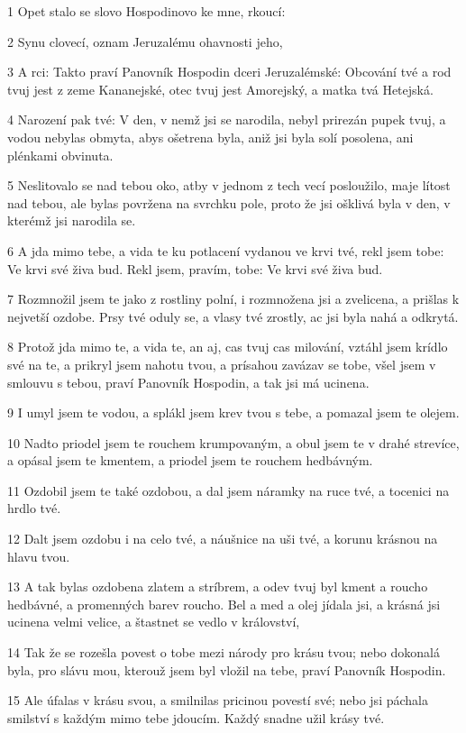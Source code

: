 \par 1 Opet stalo se slovo Hospodinovo ke mne, rkoucí:
\par 2 Synu clovecí, oznam Jeruzalému ohavnosti jeho,
\par 3 A rci: Takto praví Panovník Hospodin dceri Jeruzalémské: Obcování tvé a rod tvuj jest z zeme Kananejské, otec tvuj jest Amorejský, a matka tvá Hetejská.
\par 4 Narození pak tvé: V den, v nemž jsi se narodila, nebyl prirezán pupek tvuj, a vodou nebylas obmyta, abys ošetrena byla, aniž jsi byla solí posolena, ani plénkami obvinuta.
\par 5 Neslitovalo se nad tebou oko, atby v jednom z tech vecí posloužilo, maje lítost nad tebou, ale bylas povržena na svrchku pole, proto že jsi ošklivá byla v den, v kterémž jsi narodila se.
\par 6 A jda mimo tebe, a vida te ku potlacení vydanou ve krvi tvé, rekl jsem tobe: Ve krvi své živa bud. Rekl jsem, pravím, tobe: Ve krvi své živa bud.
\par 7 Rozmnožil jsem te jako z rostliny polní, i rozmnožena jsi a zvelicena, a prišlas k nejvetší ozdobe. Prsy tvé oduly se, a vlasy tvé zrostly, ac jsi byla nahá a odkrytá.
\par 8 Protož jda mimo te, a vida te, an aj, cas tvuj cas milování, vztáhl jsem krídlo své na te, a prikryl jsem nahotu tvou, a prísahou zavázav se tobe, všel jsem v smlouvu s tebou, praví Panovník Hospodin, a tak jsi má ucinena.
\par 9 I umyl jsem te vodou, a splákl jsem krev tvou s tebe, a pomazal jsem te olejem.
\par 10 Nadto priodel jsem te rouchem krumpovaným, a obul jsem te v drahé strevíce, a opásal jsem te kmentem, a priodel jsem te rouchem hedbávným.
\par 11 Ozdobil jsem te také ozdobou, a dal jsem náramky na ruce tvé, a tocenici na hrdlo tvé.
\par 12 Dalt jsem ozdobu i na celo tvé, a náušnice na uši tvé, a korunu krásnou na hlavu tvou.
\par 13 A tak bylas ozdobena zlatem a stríbrem, a odev tvuj byl kment a roucho hedbávné, a promenných barev roucho. Bel a med a olej jídala jsi, a krásná jsi ucinena velmi velice, a štastnet se vedlo v království,
\par 14 Tak že se rozešla povest o tobe mezi národy pro krásu tvou; nebo dokonalá byla, pro slávu mou, kterouž jsem byl vložil na tebe, praví Panovník Hospodin.
\par 15 Ale úfalas v krásu svou, a smilnilas pricinou povestí své; nebo jsi páchala smilství s každým mimo tebe jdoucím. Každý snadne užil krásy tvé.
